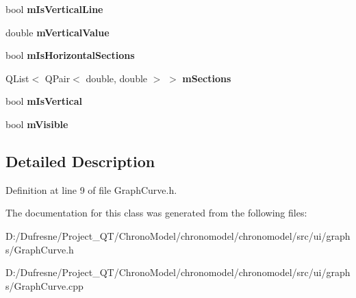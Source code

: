 \begin{DoxyCompactItemize}
\item 
\hypertarget{class_graph_curve_a95f8f752b2753a86b60a46f4f31f2fa5}{bool {\bfseries m\-Is\-Vertical\-Line}}\label{class_graph_curve_a95f8f752b2753a86b60a46f4f31f2fa5}

\item 
\hypertarget{class_graph_curve_a1931ffa2358adda4e349667644c35863}{double {\bfseries m\-Vertical\-Value}}\label{class_graph_curve_a1931ffa2358adda4e349667644c35863}

\item 
\hypertarget{class_graph_curve_ac575b0e2c65461b70257bb13ed2899c4}{bool {\bfseries m\-Is\-Horizontal\-Sections}}\label{class_graph_curve_ac575b0e2c65461b70257bb13ed2899c4}

\item 
\hypertarget{class_graph_curve_adc15512dac6ed8b9efa2c322cea96cec}{Q\-List$<$ Q\-Pair$<$ double, double $>$ $>$ {\bfseries m\-Sections}}\label{class_graph_curve_adc15512dac6ed8b9efa2c322cea96cec}

\item 
\hypertarget{class_graph_curve_ab9b90bcf9fecaf4cdf8ed6a81d20d19b}{bool {\bfseries m\-Is\-Vertical}}\label{class_graph_curve_ab9b90bcf9fecaf4cdf8ed6a81d20d19b}

\item 
\hypertarget{class_graph_curve_a95df01285f2beb1459c1f33d5175376c}{bool {\bfseries m\-Visible}}\label{class_graph_curve_a95df01285f2beb1459c1f33d5175376c}

\end{DoxyCompactItemize}


\subsection{Detailed Description}


Definition at line 9 of file Graph\-Curve.\-h.



The documentation for this class was generated from the following files\-:\begin{DoxyCompactItemize}
\item 
D\-:/\-Dufresne/\-Project\-\_\-\-Q\-T/\-Chrono\-Model/chronomodel/chronomodel/src/ui/graphs/Graph\-Curve.\-h\item 
D\-:/\-Dufresne/\-Project\-\_\-\-Q\-T/\-Chrono\-Model/chronomodel/chronomodel/src/ui/graphs/Graph\-Curve.\-cpp\end{DoxyCompactItemize}
